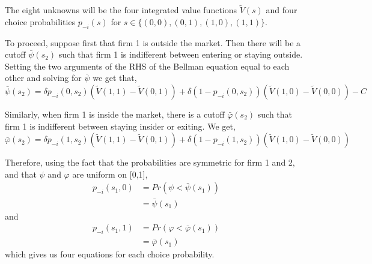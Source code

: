 \documentclass{article}
\begin{document}
\begin{enumerate}
\begin{answer}

The eight unknowns will be the four integrated value functions $\tilde{V}(s)$ and four choice probabilities $p_{-i}(s)$ for $s \in \{(0,0), (0,1), (1,0), (1,1)\}$.

To proceed, suppose first that firm 1 is outside the market. Then there will be a cutoff $\bar{\psi}(s_2)$ such that firm 1 is indifferent between entering or staying outside. Setting the two arguments of the RHS of the Bellman equation equal to each other and solving for $\bar{\psi}$ we get that,
\[
\bar{\psi}(s_2) = \delta p_{-i}(0,s_2)(\tilde{V}(1,1)-\tilde{V}(0,1)) +  \delta (1- p_{-i}(0,s_2))(\tilde{V}(1,0)-\tilde{V}(0,0)) - C
\]

Similarly, when firm 1 is inside the market, there is a cutoff $\bar{\varphi}(s_2)$ such that firm 1 is indifferent between staying insider or exiting. We get,
\[
\bar{\varphi}(s_2) = \delta p_{-i}(1,s_2)(\tilde{V}(1,1)-\tilde{V}(0,1)) + \delta (1-p_{-i}(1,s_2))(\tilde{V}(1,0)-\tilde{V}(0,0))
\] 

Therefore, using the fact that the  probabilities are symmetric for firm 1 and 2, and that $\psi$ and $\varphi$ are uniform on [0,1],
\begin{align*}
    p_{-i}(s_1,0) &= Pr(\psi < \bar{\psi}(s_1)) \\
    &= \bar{\psi}(s_1)
\end{align*}
and
\begin{align*}
    p_{-i}(s_1,1) &= Pr(\varphi < \bar{\varphi}(s_1)) \\
    &= \bar{\varphi}(s_1)
\end{align*}
which gives us four equations for each choice probability.


\end{answer}
\end{enumerate}
\end{document}
